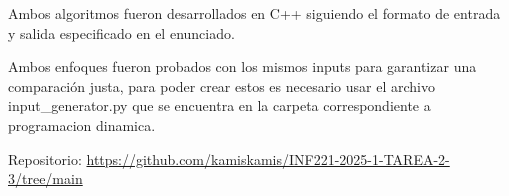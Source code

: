 Ambos algoritmos fueron desarrollados en C++ siguiendo el formato de entrada y salida especificado en el enunciado. 

Ambos enfoques fueron probados con los mismos inputs para garantizar una comparación justa, para poder crear estos es necesario usar el archivo input_generator.py que se encuentra en la carpeta correspondiente a programacion dinamica.

Repositorio: \url{https://github.com/kamiskamis/INF221-2025-1-TAREA-2-3/tree/main}

